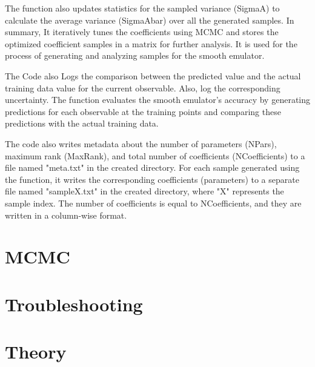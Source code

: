 \documentclass[12pt]{article}
\numberwithin{equation}{section}
\numberwithin{figure}{section}
\begin{document}
The function also updates statistics for the sampled variance (SigmaA) to calculate the average variance (SigmaAbar) over all the generated samples. In summary, It iteratively tunes the coefficients using MCMC and stores the optimized coefficient samples in a matrix for further analysis. It is used for the process of generating and analyzing samples for the smooth emulator.

The Code also Logs the comparison between the predicted value and the actual training data value for the current observable. Also, log the corresponding uncertainty. The function evaluates the smooth emulator's accuracy by generating predictions for each observable at the training points and comparing these predictions with the actual training data.  

The code also writes metadata about the number of parameters (NPars), maximum rank (MaxRank), and total number of coefficients (NCoefficients) to a file named "meta.txt" in the created directory. For each sample generated using the function, it writes the corresponding coefficients (parameters) to a separate file named "sampleX.txt" in the created directory, where "X" represents the sample index. The number of coefficients is equal to NCoefficients, and they are written in a column-wise format. 


\section{MCMC}


\section{Troubleshooting}


\section{Theory}
\end{document}
